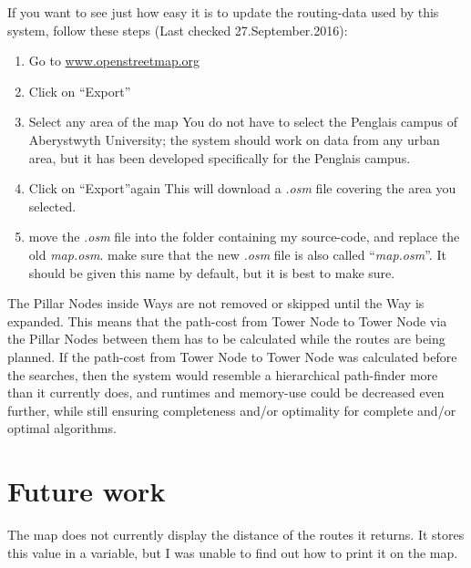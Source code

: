 If you want to see just how easy it is to update the routing-data used by this system, follow these steps (Last checked 27.September.2016):
\begin{enumerate}
	\item Go to \url{www.openstreetmap.org}
	\item Click on \textquotedblleft Export\textquotedblright
	\item Select any area of the map
	\subitem You do not have to select the Penglais campus of Aberystwyth University; the system should work on data from any urban area, but it has been developed specifically for the Penglais campus.
	\item Click on \textquotedblleft Export\textquotedblright again
	\subitem This will download a \textit{.osm} file covering the area you selected.
	\item move the \textit{.osm} file into the folder containing my source-code, and replace the old \textit{map.osm}.
	\subitem make sure that the new \textit{.osm} file is also called \textquotedblleft \textit{map.osm}\textquotedblright.
	\subsubitem It should be given this name by default, but it is best to make sure.
\end{enumerate}


The Pillar Nodes inside Ways are not removed or skipped until the Way is expanded. This means that the path-cost from Tower Node to Tower Node via the Pillar Nodes between them has to be calculated while the routes are being planned. If the path-cost from Tower Node to Tower Node was calculated before the searches, then the system would resemble a hierarchical path-finder more than it currently does, and runtimes and memory-use could be decreased even further, while still ensuring completeness and/or optimality for complete and/or optimal algorithms.


\section{Future work}
The map does not currently display the distance of the routes it returns. It stores this value in a variable, but I was unable to find out how to print it on the map.

